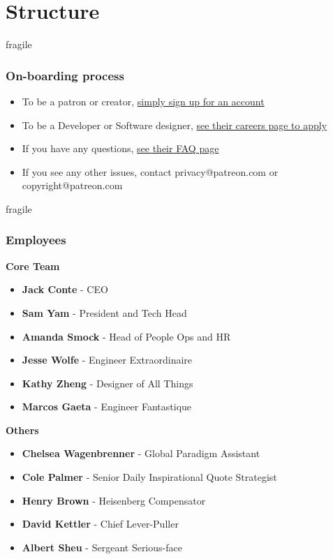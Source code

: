 \documentclass[10pt, compress]{beamer}
\begin{document}
\section{Structure}

\begin{frame}{fragile}
\frametitle{On-boarding process}
    \begin{itemize}
    \item To be a patron or creator, \href{https://www.patreon.com/signup}{\alert{simply sign up for an account}}
    \item To be a Developer or Software designer, \href{https://www.patreon.com/careers}{\alert{see their careers page to apply}}
    \item If you have any questions, \href{http://support.patreon.com/}{\alert{see their FAQ page}}
    \item If you see any other issues, contact privacy@patreon.com or copyright@patreon.com
    \end{itemize}
\end{frame}

\begin{frame}{fragile}
\frametitle{Employees}
\textbf{Core Team}
    \begin{itemize}
    \item \textbf{Jack Conte} - CEO
    \item \textbf{Sam Yam} - President and Tech Head
    \item \textbf{Amanda Smock} - Head of People Ops and HR
    \item \textbf{Jesse Wolfe} - Engineer Extraordinaire
    \item \textbf{Kathy Zheng} - Designer of All Things
    \item \textbf{Marcos Gaeta} - Engineer Fantastique
    \end{itemize}
\textbf{Others}
    \begin{itemize}
    \item \textbf{Chelsea Wagenbrenner} - Global Paradigm Assistant
    \item \textbf{Cole Palmer} - Senior Daily Inspirational Quote Strategist
    \item \textbf{Henry Brown} - Heisenberg Compensator
    \item \textbf{David Kettler} - Chief Lever-Puller
    \item \textbf{Albert Sheu} - Sergeant Serious-face
    \end{itemize}
\end{frame}
\end{document}

